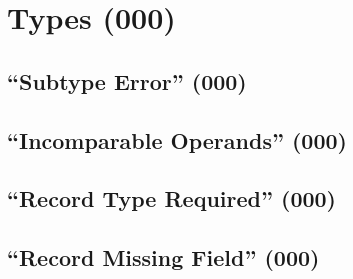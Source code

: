 \section{Types (000)}

\subsection{``Subtype Error'' (000)}

\subsection{``Incomparable Operands'' (000)}

\subsection{``Record Type Required'' (000)}

\subsection{``Record Missing Field'' (000)}

